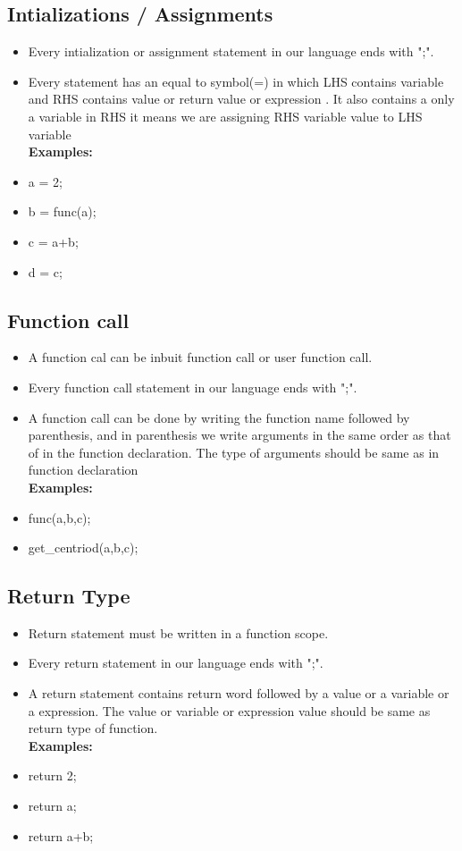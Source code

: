 \documentclass[12pt]{article}
\begin{document}



\subsection{Intializations / Assignments}
\begin{itemize}
    \item Every intialization or assignment statement in our language ends with ";".
    \item Every statement has an equal to symbol(=) in which LHS contains variable and RHS contains  value or return value or expression . It also contains a only a variable in RHS it means we are assigning RHS variable value to LHS variable  \\
    \textbf{Examples:}
    \item a = 2;
    \item b = func(a);
    \item c = a+b;
    \item d = c;
\end{itemize}


\subsection{Function call}
\begin{itemize}
    \item A function cal can be inbuit function call or user function call.
    \item Every function call statement in our language ends with ";".
   \item A function call can be done by writing the function name  followed by parenthesis, and in parenthesis we write arguments in the same order as that of in the function declaration. The type of arguments should be same as in function declaration\\
   \textbf{Examples:}
   \item func(a,b,c);
   \item get\_centriod(a,b,c);
   
\end{itemize}
\subsection{Return Type}
\begin{itemize}
    \item Return statement must be written in a function scope.
    \item Every return statement in our language ends with ";".
   \item A return statement contains return word followed by a value or a variable or a expression. The value or variable or expression value should be same as return type of function.\\
   \textbf{Examples:}
   \item return 2;
   \item return a;
   \item return a+b;
   
\end{itemize}
\end{document}
